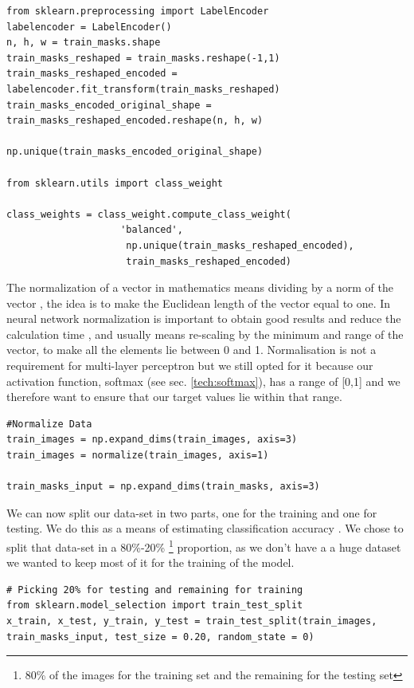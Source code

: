 \documentclass[12pt,a4paper]{scrartcl}
\begin{document}
\begin{lstlisting}[caption={Encoding of the labels and weights attributions to the class, code from \emph{train.py} file}]
from sklearn.preprocessing import LabelEncoder
labelencoder = LabelEncoder()
n, h, w = train_masks.shape
train_masks_reshaped = train_masks.reshape(-1,1)
train_masks_reshaped_encoded = labelencoder.fit_transform(train_masks_reshaped)
train_masks_encoded_original_shape = train_masks_reshaped_encoded.reshape(n, h, w)

np.unique(train_masks_encoded_original_shape)

from sklearn.utils import class_weight

class_weights = class_weight.compute_class_weight(
                    'balanced',
                     np.unique(train_masks_reshaped_encoded),
                     train_masks_reshaped_encoded)
\end{lstlisting}

The normalization of a vector in mathematics means dividing by a norm of the vector \cite{Normalization_Vector_Machines:2001}, the idea is to make the Euclidean length of the vector equal to one. In neural network normalization is important to obtain good results and reduce the calculation time \cite{Normalizazion_NN}, and usually means re-scaling by the minimum and range of the vector, to make all the elements lie between 0 and 1. Normalisation is not a requirement for multi-layer perceptron but we still opted for it because our activation function, softmax (see sec. \ref{tech:softmax}), has a range of [0,1] and we therefore want to ensure that our target values lie within that range.

\begin{lstlisting}[caption={Normalize the data, the code can be found in the \emph{train.py} file}]
#Normalize Data
train_images = np.expand_dims(train_images, axis=3)
train_images = normalize(train_images, axis=1)

train_masks_input = np.expand_dims(train_masks, axis=3)
\end{lstlisting}

We can now split our data-set in two parts, one for the training and one for testing. We do this as a means of estimating classification accuracy \cite{DatasetSplitting:2011}. We chose to split that data-set in a 80\%-20\% \footnote{80\% of the images for the training set and the remaining for the testing set} proportion, as we don't have a a huge dataset we wanted to keep most of it for the training of the model.
\begin{lstlisting}[caption={Dataset split for testing and training from the \emph{train.py} file}, label={lst:data-split}]
# Picking 20% for testing and remaining for training
from sklearn.model_selection import train_test_split
x_train, x_test, y_train, y_test = train_test_split(train_images, train_masks_input, test_size = 0.20, random_state = 0) 
\end{lstlisting}
\end{document}
